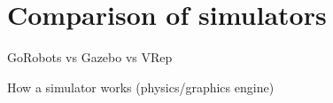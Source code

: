 \section{Comparison of simulators} %
\label{sec:sim_comparison_of_simulators}
GoRobots vs Gazebo vs VRep

How a simulator works (physics/graphics engine)


